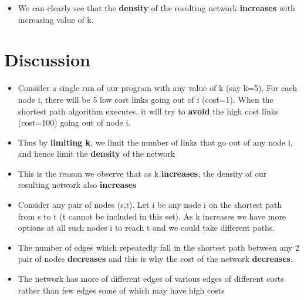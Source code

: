 \documentclass[12pt,letterpaper,titlepage,en-US]{article}
\begin{document}
\begin{itemize}
\item We can clearly see that the \textbf{density} of the resulting network \textbf{increases} with increasing value of k.
\end{itemize}
 
\section{Discussion}
\begin{itemize}

\item Consider a single run of our program with any value of k (say k=5). For each node i, there will be 5 low cost links going out of i (cost=1). When the shortest path algorithm executes, it will try to \textbf{avoid} the high cost links (cost=100) going out of node i.

\item Thus by \textbf{limiting k}, we limit the number of links that go out of any node i, and hence limit the \textbf{density} of the network

\item This is the reason we observe that as k \textbf{increases}, the density of our resulting network also \textbf{increases}

\item Consider any pair of nodes (s,t). Let i be any node i on the shortest path from s to t (t cannot be included in this set). As k increases we have more options at all such nodes i to reach t and we could take different paths.

\item The number of edges which repeatedly fall in the shortest path between any 2 pair of nodes \textbf{decreases} and this is why the cost of the network \textbf{decreases}.

\item The network has more of different edges of various edges of different costs rather than few edges some of which may have high costs

\end{itemize}
\end{document}

